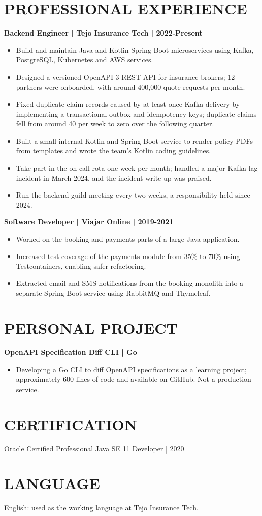 \documentclass[11pt,a4paper]{article}
\begin{document}
\section*{PROFESSIONAL EXPERIENCE}
\textbf{Backend Engineer | Tejo Insurance Tech | 2022-Present}
\begin{itemize}
\item Build and maintain Java and Kotlin Spring Boot microservices using Kafka, PostgreSQL, Kubernetes and AWS services.
\item Designed a versioned OpenAPI 3 REST API for insurance brokers; 12 partners were onboarded, with around 400,000 quote requests per month.
\item Fixed duplicate claim records caused by at-least-once Kafka delivery by implementing a transactional outbox and idempotency keys; duplicate claims fell from around 40 per week to zero over the following quarter.
\item Built a small internal Kotlin and Spring Boot service to render policy PDFs from templates and wrote the team's Kotlin coding guidelines.
\item Take part in the on-call rota one week per month; handled a major Kafka lag incident in March 2024, and the incident write-up was praised.
\item Run the backend guild meeting every two weeks, a responsibility held since 2024.
\end{itemize}

\textbf{Software Developer | Viajar Online | 2019-2021}
\begin{itemize}
\item Worked on the booking and payments parts of a large Java application.
\item Increased test coverage of the payments module from 35\% to 70\% using Testcontainers, enabling safer refactoring.
\item Extracted email and SMS notifications from the booking monolith into a separate Spring Boot service using RabbitMQ and Thymeleaf.
\end{itemize}

\section*{PERSONAL PROJECT}
\textbf{OpenAPI Specification Diff CLI | Go}
\begin{itemize}
\item Developing a Go CLI to diff OpenAPI specifications as a learning project; approximately 600 lines of code and available on GitHub. Not a production service.
\end{itemize}

\section*{CERTIFICATION}
Oracle Certified Professional Java SE 11 Developer | 2020

\section*{LANGUAGE}
English: used as the working language at Tejo Insurance Tech.
\end{document}
